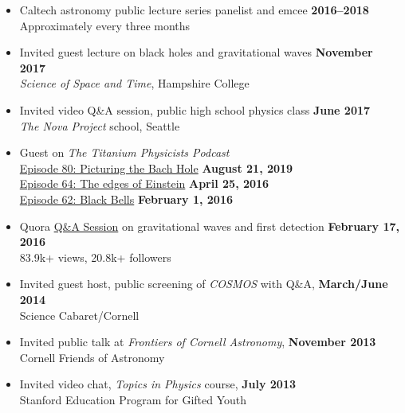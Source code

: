 \documentclass[margin,line]{res}
\begin{document}
\begin{resume}
\begin{itemize}
    \item[] Caltech astronomy public lecture series panelist and emcee
      \hfill {\bf 2016--2018} \\
      \hspace*{1em} Approximately every three months

    \item[] Invited guest lecture on black holes and gravitational waves \hfill {\bf November 2017} \\
      \hspace*{1em} {\it Science of Space and Time}, Hampshire College

    \item[] Invited video Q\&A session, public high school physics class \hfill {\bf June 2017} \\
      \hspace*{1em} {\it The Nova Project} school, Seattle

    \item[] Guest on {\it The Titanium Physicists Podcast} \\
      \hspace*{1em}
      \href{http://titaniumphysicists.brachiolopemedia.com/2019/08/21/episode-80-picturing-the-bach-hole-with-adal-rifai/}{Episode
        80: Picturing the Bach Hole}
      \hfill
      {\bf August 21, 2019} \\
      \hspace*{1em} \href{http://titaniumphysicists.brachiolopemedia.com/2016/04/25/episode-64-e-and-n-the-edges-of-einstein/}{Episode 64: The edges of Einstein}
      \hfill
      {\bf April 25, 2016} \\
      \hspace*{1em} \href{http://titaniumphysicists.brachiolopemedia.com/2016/02/01/episode-62-black-bells-with-brent-knopf-and-matt-sheehy/}{Episode 62: Black Bells}
      \hfill
      {\bf February 1, 2016} \\

    \item[] Quora \href{https://www.quora.com/session/Leo-C-Stein/1}{Q\&A Session} on gravitational waves and first detection
      \hfill {\bf February 17, 2016} \\
      \hspace*{1em} 83.9k+ views, 20.8k+ followers

    \item[] Invited guest host, public screening of {\it COSMOS} with Q\&A,
      \hfill {\bf March/June 2014} \\
      \hspace*{1em} Science Cabaret/Cornell
    \item[] Invited public talk at {\it Frontiers of Cornell Astronomy}, \hfill {\bf November 2013} \\
      \hspace*{1em} Cornell Friends of Astronomy
    \item[] Invited video chat, {\it Topics in Physics} course, \hfill {\bf July 2013} \\
      \hspace*{1em} Stanford Education Program for Gifted Youth
  \end{itemize}


\end{resume}
\end{document}
